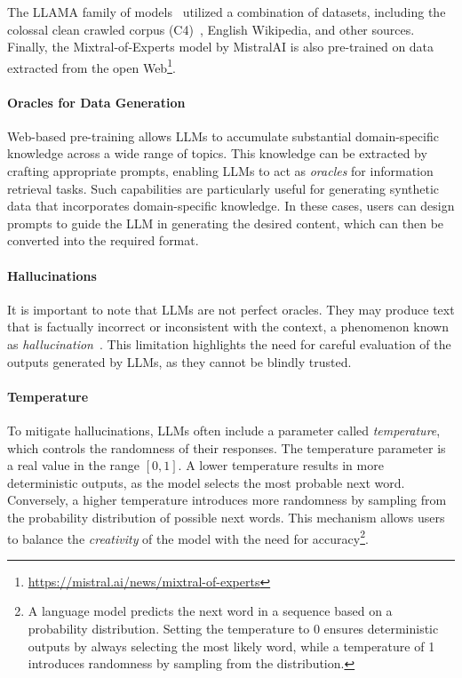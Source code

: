 %
The LLAMA family of models~\cite{llama1,llama2} utilized a combination of datasets, including the colossal clean crawled corpus (C4)~\cite{RaffelSRLNMZLL20}, English Wikipedia, and other sources.
%
Finally, the Mixtral-of-Experts model by MistralAI is also pre-trained on data extracted from the open Web\footnote{\url{https://mistral.ai/news/mixtral-of-experts}}.


\paragraph{Oracles for Data Generation}
%
Web-based pre-training allows \glspl{LLM} to accumulate substantial domain-specific knowledge across a wide range of topics.
%
This knowledge can be extracted by crafting appropriate prompts, enabling \glspl{LLM} to act as \emph{oracles} for information retrieval tasks.
%
Such capabilities are particularly useful for generating synthetic data that incorporates domain-specific knowledge.
%
In these cases, users can design prompts to guide the \gls{LLM} in generating the desired content, which can then be converted into the required format.


\paragraph{Hallucinations}
%
It is important to note that \glspl{LLM} are not perfect oracles.
%
They may produce text that is factually incorrect or inconsistent with the context, a phenomenon known as \emph{hallucination}~\cite{hallucination-2023}.
%
This limitation highlights the need for careful evaluation of the outputs generated by \glspl{LLM}, as they cannot be blindly trusted.

%
\paragraph{Temperature}
%
To mitigate hallucinations, \glspl{LLM} often include a parameter called \emph{temperature}, which controls the randomness of their responses.
%
The temperature parameter is a real value in the range \([0, 1]\).
%
A lower temperature results in more deterministic outputs, as the model selects the most probable next word.
%
Conversely, a higher temperature introduces more randomness by sampling from the probability distribution of possible next words.
%
This mechanism allows users to balance the \emph{creativity} of the model with the need for accuracy\footnote{
    A language model predicts the next word in a sequence based on a probability distribution.
    Setting the temperature to 0 ensures deterministic outputs by always selecting the most likely word, while a temperature of 1 introduces randomness by sampling from the distribution.
}.



